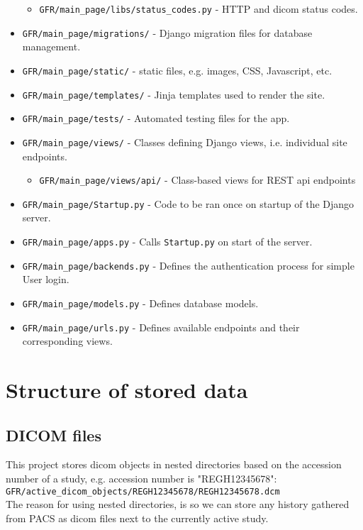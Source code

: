 \documentclass{article}
\begin{document}
\begin{itemize}
\begin{itemize}
		\item \texttt{GFR/main\_page/libs/status\_codes.py} - HTTP and dicom status codes.
	\end{itemize}
	\item \texttt{GFR/main\_page/migrations/} - Django migration files for database management.
	\item \texttt{GFR/main\_page/static/} - static files, e.g. images, CSS, Javascript, etc.
	\item \texttt{GFR/main\_page/templates/} - Jinja templates used to render the site.
	\item \texttt{GFR/main\_page/tests/} - Automated testing files for the app.
	\item \texttt{GFR/main\_page/views/} - Classes defining Django views, i.e. individual site endpoints.
	\begin{itemize}
		\item \texttt{GFR/main\_page/views/api/} - Class-based views for REST api endpoints
	\end{itemize}
	\item \texttt{GFR/main\_page/Startup.py} - Code to be ran once on startup of the Django server.
	\item \texttt{GFR/main\_page/apps.py} - Calls \texttt{Startup.py} on start of the server.
	\item \texttt{GFR/main\_page/backends.py} - Defines the authentication process for simple User login.
	\item \texttt{GFR/main\_page/models.py} - Defines database models.
	\item \texttt{GFR/main\_page/urls.py} - Defines available endpoints and their corresponding views.
\end{itemize}

\section{Structure of stored data}
\subsection{DICOM files}
This project stores dicom objects in nested directories based on the accession number of a study, e.g. accession number is "REGH12345678": \\ \texttt{GFR/active\_dicom\_objects/REGH12345678/REGH12345678.dcm} \\
The reason for using nested directories, is so we can store any history gathered from PACS as dicom files next to the currently active study. \\
\end{document}
